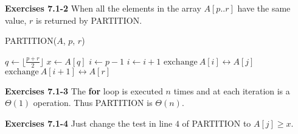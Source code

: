 \documentclass[a4paper,12pt]{article}
\newcommand{\newpar}[1]
{\bigskip \noindent \textbf{Exercises #1} \newline}
\newcommand{\la}{\leftarrow}
\begin{document}
\newpar{7.1-2}
When all the elements in the array $A[p..r]$ have the same value,  $r$
is returned by \textsc{PARTITION}.

\medskip \noindent
\textsc{PARTITION}($A$, $p$, $r$)
\begin{algorithmic}
  \STATE $q \la \lfloor \frac{p+r}{2}\rfloor$
  \STATE $x \la A[q]$
  \STATE $i \la p-1$
  \FOR{$j\la p$ to $r-1$}
  \STATE $i \la i+1$
  \STATE $\mathrm{exchange}\ A[i] \leftrightarrow A[j]$
  \ENDIF
  \ENDFOR
  \STATE $\mathrm{exchange}\ A[i+1] \leftrightarrow A[r]$
\end{algorithmic}

\newpar{7.1-3}
The \textbf{for} loop is executed $n$ times and at each iteration is a
$\Theta(1)$ operation.  Thus \textsc{PARTITION} is $\Theta(n)$.

\newpar{7.1-4}
Just change the test in line $4$ of \textsc{PARTITION} to $A[j] \ge x$.
\end{document}
